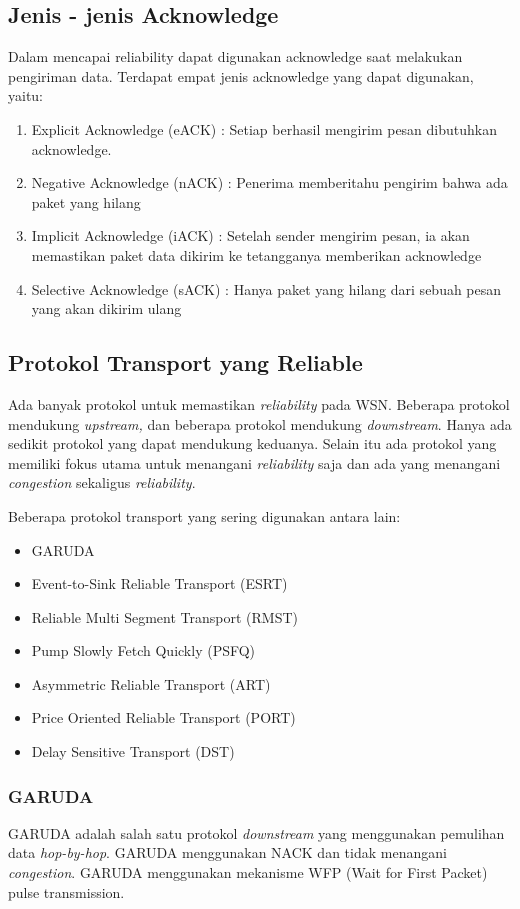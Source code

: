 \subsection{Jenis - jenis Acknowledge}
Dalam mencapai reliability dapat digunakan acknowledge saat melakukan pengiriman data. Terdapat empat jenis acknowledge yang dapat digunakan, yaitu:
\begin{enumerate}
	\item Explicit Acknowledge (eACK) : Setiap berhasil mengirim pesan dibutuhkan acknowledge.
	\item Negative Acknowledge (nACK) : Penerima memberitahu pengirim bahwa ada paket yang hilang

	\item Implicit Acknowledge (iACK) : Setelah sender mengirim pesan, ia akan memastikan paket data dikirim ke tetangganya memberikan acknowledge
	\item Selective Acknowledge (sACK) : Hanya paket yang hilang dari sebuah pesan yang akan dikirim ulang
\end{enumerate}

\subsection{Protokol Transport yang Reliable}
Ada banyak protokol untuk memastikan \textit{reliability} pada WSN. Beberapa protokol mendukung \textit{upstream,} dan beberapa protokol mendukung \textit{downstream}. Hanya ada sedikit protokol yang dapat mendukung keduanya. Selain itu ada protokol yang memiliki fokus utama untuk menangani \textit{reliability} saja dan ada yang menangani \textit{congestion} sekaligus \textit{reliability}. 

Beberapa protokol transport yang sering digunakan antara lain:
\begin{itemize}
	\item GARUDA
	\item Event-to-Sink Reliable Transport (ESRT)
	\item Reliable Multi Segment Transport (RMST)
	\item Pump Slowly Fetch Quickly (PSFQ)
	\item Asymmetric Reliable Transport (ART)
	\item Price Oriented Reliable Transport (PORT)
	\item Delay Sensitive Transport (DST)
\end{itemize}

\subsubsection{GARUDA}
GARUDA adalah salah satu protokol \textit{downstream} yang menggunakan pemulihan data \textit{hop-by-hop}. GARUDA menggunakan NACK dan tidak menangani \textit{congestion}. GARUDA menggunakan mekanisme WFP (Wait for First Packet) pulse transmission.

